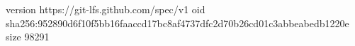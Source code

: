 version https://git-lfs.github.com/spec/v1
oid sha256:952890d6f10f5bb16faaccd17bc8af4737dfc2d70b26cd01c3abbeabedb1220e
size 98291
